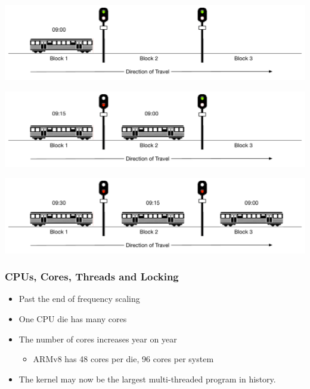 \documentclass[pdftex]{beamer} %
\begin{document}
\begin{frame}
      \includegraphics[width=\textwidth]{../../figures/block-signaling-1.pdf}
\end{frame}

\begin{frame}
      \includegraphics[width=\textwidth]{../../figures/block-signaling-2.pdf}
\end{frame}

\begin{frame}
      \includegraphics[width=\textwidth]{../../figures/block-signaling-3.pdf}
\end{frame}

\begin{frame}
  \frametitle{CPUs, Cores, Threads and Locking}
  \begin{itemize}
  \item Past the end of frequency scaling
  \item One CPU die has many cores
  \item The number of cores increases year on year
    \begin{itemize}
    \item ARMv8 has 48 cores per die, 96 cores per system
    \end{itemize}
  \item The kernel may now be the largest multi-threaded program in history.
  \end{itemize}
\end{frame}
\end{document}
